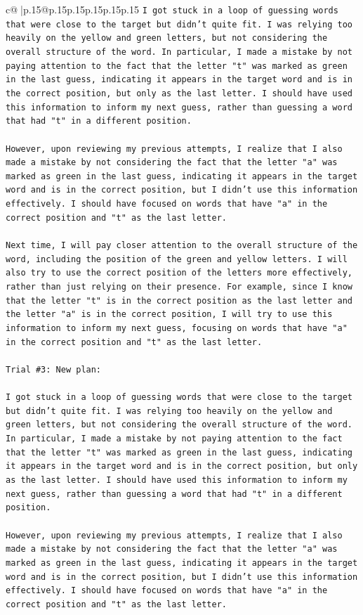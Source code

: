 \documentclass{article}
\begin{document}
{\begin{supertabular}{c@{$\;$}|p{.15\linewidth}@{}p{.15\linewidth}p{.15\linewidth}p{.15\linewidth}p{.15\linewidth}p{.15\linewidth}}
{{{\texttt{I got stuck in a loop of guessing words that were close to the target but didn't quite fit. I was relying too heavily on the yellow and green letters, but not considering the overall structure of the word. In particular, I made a mistake by not paying attention to the fact that the letter "t" was marked as green in the last guess, indicating it appears in the target word and is in the correct position, but only as the last letter. I should have used this information to inform my next guess, rather than guessing a word that had "t" in a different position.} \\
\\ 
\texttt{However, upon reviewing my previous attempts, I realize that I also made a mistake by not considering the fact that the letter "a" was marked as green in the last guess, indicating it appears in the target word and is in the correct position, but I didn't use this information effectively. I should have focused on words that have "a" in the correct position and "t" as the last letter.} \\
\\ 
\texttt{Next time, I will pay closer attention to the overall structure of the word, including the position of the green and yellow letters. I will also try to use the correct position of the letters more effectively, rather than just relying on their presence. For example, since I know that the letter "t" is in the correct position as the last letter and the letter "a" is in the correct position, I will try to use this information to inform my next guess, focusing on words that have "a" in the correct position and "t" as the last letter.} \\
\\ 
\texttt{Trial \#3: New plan: } \\
\\ 
\texttt{I got stuck in a loop of guessing words that were close to the target but didn't quite fit. I was relying too heavily on the yellow and green letters, but not considering the overall structure of the word. In particular, I made a mistake by not paying attention to the fact that the letter "t" was marked as green in the last guess, indicating it appears in the target word and is in the correct position, but only as the last letter. I should have used this information to inform my next guess, rather than guessing a word that had "t" in a different position.} \\
\\ 
\texttt{However, upon reviewing my previous attempts, I realize that I also made a mistake by not considering the fact that the letter "a" was marked as green in the last guess, indicating it appears in the target word and is in the correct position, but I didn't use this information effectively. I should have focused on words that have "a" in the correct position and "t" as the last letter.} \\
}}}
\end{supertabular}}
\end{document}
